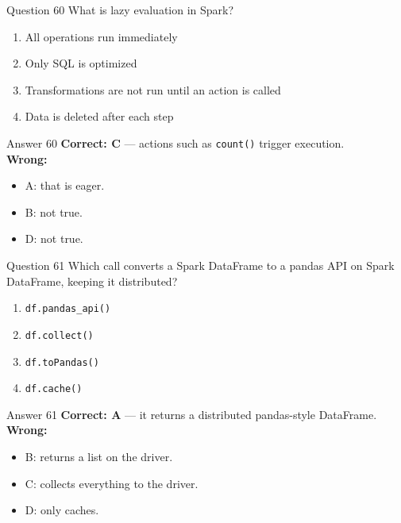 \documentclass[aspectratio=169,11pt]{beamer}
\begin{document}
	\begin{frame}{Question 60}
		What is lazy evaluation in Spark?
		\begin{enumerate}[label=\Alph*.]
			\item All operations run immediately
			\item Only SQL is optimized
			\item Transformations are not run until an action is called
			\item Data is deleted after each step
		\end{enumerate}
	\end{frame}
	\begin{frame}{Answer 60}
		\textbf{Correct: C} --- actions such as \texttt{count()} trigger execution.\\
		\vspace{0.5em}
		\textbf{Wrong:}
		\begin{itemize}
			\item A: that is eager.
			\item B: not true.
			\item D: not true.
		\end{itemize}
	\end{frame}
	
	\begin{frame}{Question 61}
		Which call converts a Spark DataFrame to a pandas API on Spark DataFrame, keeping it distributed?
		\begin{enumerate}[label=\Alph*.]
			\item \texttt{df.pandas\_api()}
			\item \texttt{df.collect()}
			\item \texttt{df.toPandas()}
			\item \texttt{df.cache()}
		\end{enumerate}
	\end{frame}
	\begin{frame}{Answer 61}
		\textbf{Correct: A} --- it returns a distributed pandas-style DataFrame.\\
		\vspace{0.5em}
		\textbf{Wrong:}
		\begin{itemize}
			\item B: returns a list on the driver.
			\item C: collects everything to the driver.
			\item D: only caches.
		\end{itemize}
	\end{frame}
	
\end{document}
